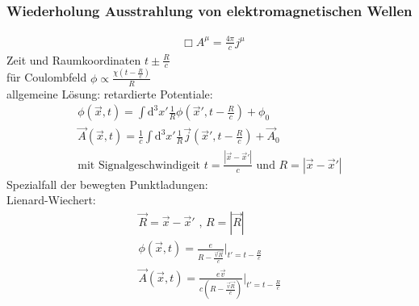\documentclass[a4paper]{article}
\newcommand*\dalembert{\mathop{}\!\mathbin\Box}
\begin{document}
\subsubsection{Wiederholung Ausstrahlung von elektromagnetischen Wellen}
\begin{align}
\dalembert A^\mu=\frac{4\pi}{c}j^\mu
\end{align}
Zeit und Raumkoordinaten $t\pm\frac{R}{c}$\\
für Coulombfeld $\phi\propto\frac{\chi(t-\frac{R}{c})}{R}$\\
allgemeine Lösung: retardierte Potentiale:\\
\begin{align}
\phi(\vec{x},t)=\int \mathrm{d}^3x' \frac{1}{R}\phi(\vec{x}',t-\frac{R}{c})+\phi_0\\
\vec{A}(\vec{x},t)=\frac{1}{c}\int \mathrm{d}^3x'
\frac{1}{R}\vec{j}(\vec{x}',t-\frac{R}{c})+\vec{A}_0\\
\text{mit Signalgeschwindigeit }t=\frac{|\vec{x}-\vec{x}'|}{c} \text{ und }
R=|\vec{x}-\vec{x}'|
\end{align}
Spezialfall der bewegten Punktladungen:\\
Lienard-Wiechert:
\begin{align}
\vec{R}=\vec{x}-\vec{x}' \text{ , } R=|\vec{R}|\\
\phi(\vec{x},t)=\frac{e}{R-\frac{\vec{v}\vec{R}}{c}}|_{t'=t-\frac{R}{c}}\\
\vec{A}(\vec{x},t)=\frac{e\vec{v}}{c(R-\frac{\vec{v}\vec{R}}{c})}|_{t'=t-\frac{R}{c}}
\end{align}
\end{document}
